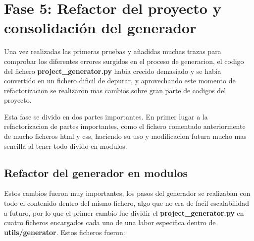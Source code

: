 \section{Fase 5: Refactor del proyecto y consolidación del generador}
\label{sec:refactor-consolidacion-generador}

Una vez realizadas las primeras pruebas y añadidas muchas trazas para comprobar los diferentes errores surgidos en el proceso de generacion, el codigo del 
fichero \textbf{project\_generator.py} habia crecido demasiado y se habia convertido en un fichero dificil de depurar, y aprovechando este momento de refactorizacion se realizaron mas cambios sobre gran parte de codigos del proyecto.

Esta fase se divido en dos partes importantes. En primer lugar a la refactorizacion de partes importantes, como el fichero comentado anteriormente de mucho ficheros html y css, haciendo su uso y modificacion futura mucho mas sencilla al tener todo divido en modulos.

\subsection{Refactor del generador en modulos}
\label{subsec:refactor-generador-modulos}

Estos cambios fueron muy importantes, los pasos del generador se realizaban con todo el contenido dentro del mismo fichero, algo que no era de facil escalabilidad a futuro, por lo que el primer cambio fue dividir el \textbf{project\_generator.py} en cuatro ficheros encargados cada uno de una labor
especifica dentro de \textbf{utils/generator}. Estos ficheros fueron:

